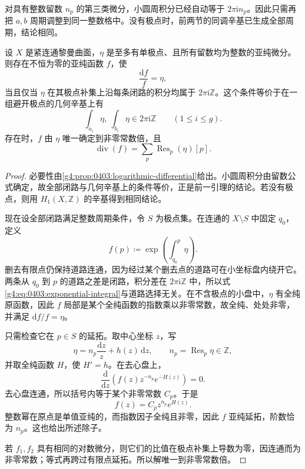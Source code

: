 对具有整数留数 \(n_p\) 的第三类微分，小圆周积分已经自动等于 \(2\pi\mathrm{i}n_p\)。因此只需再把 \(a,b\) 周期调整到同一整数格中。没有极点时，前两节的同调辛基已生成全部周期，结论相同。

\begin{proposition}
	\label{g4:prop:0403:exponential-integral}
	设 \(X\) 是紧连通黎曼曲面，\(\eta\) 是至多有单极点、且所有留数均为整数的亚纯微分。则存在不恒为零的亚纯函数 \(f\)，使
	\[
		\frac{\mathrm{d}f}{f}=\eta,
	\]
	当且仅当 \(\eta\) 在其极点补集上沿每条闭路的积分均属于 \(2\pi\mathrm{i}\mathbb Z\)。这个条件等价于在一组避开极点的几何辛基上有
	\[
		\int_{a_i}\eta,\ \int_{b_i}\eta\in2\pi\mathrm{i}\mathbb Z
		\qquad(1\le i\le g).
	\]
	存在时，\(f\) 由 \(\eta\) 唯一确定到非零常数倍，且
	\[
		\operatorname{div}(f)
		=\sum_p\operatorname{Res}_p(\eta)[p].
	\]
\end{proposition}
\begin{proof}
	必要性由\cref{g4:prop:0403:logarithmic-differential}给出。小圆周积分由留数公式确定，故全部闭路与几何辛基上的条件等价，正是前一引理的结论。若没有极点，则用 \(H_1(X,\mathbb Z)\) 的辛基得到相同结论。

	现在设全部闭路满足整数周期条件，令 \(S\) 为极点集。在连通的 \(X\setminus S\) 中固定 \(q_0\)，定义
	\begin{equation}
		\label{g4:eq:0403:exponential-integral}
		f(p)\coloneqq
		\exp\left(\int_{q_0}^{p}\eta\right).
	\end{equation}
	删去有限点仍保持道路连通，因为经过某个删去点的道路可在小坐标盘内绕开它。两条从 \(q_0\) 到 \(p\) 的道路之差是闭路，积分差在 \(2\pi\mathrm{i}\mathbb Z\) 中，所以式\eqref{g4:eq:0403:exponential-integral}与道路选择无关。在不含极点的小盘中，\(\eta\) 有全纯原函数，因此 \(f\) 局部是某个全纯函数的指数乘以非零常数，故全纯、处处非零，并满足 \(\mathrm{d}f/f=\eta\)。

	只需检查它在 \(p\in S\) 的延拓。取中心坐标 \(z\)，写
	\[
		\eta=n_p\frac{\mathrm{d}z}{z}+h(z)\,\mathrm{d}z,
		\qquad n_p=\operatorname{Res}_p\eta\in\mathbb Z,
	\]
	并取全纯函数 \(H\)，使 \(H'=h\)。在去心盘上，
	\[
		\frac{\mathrm{d}}{\mathrm{d}z}
		\left(f(z)z^{-n_p}e^{-H(z)}\right)=0.
	\]
	去心盘连通，所以括号内等于某个非零常数 \(C_p\)。于是
	\begin{equation}
		\label{g4:eq:0403:local-exponential}
		f(z)=C_p z^{n_p}e^{H(z)}.
	\end{equation}
	整数幂在原点是单值亚纯的，而指数因子全纯且非零，因此 \(f\) 亚纯延拓，阶数恰为 \(n_p\)。这也给出所述除子。

	若 \(f_1,f_2\) 具有相同的对数微分，则它们的比值在极点补集上导数为零，因连通而为非零常数；等式再跨过有限点延拓。所以解唯一到非零常数倍。
\end{proof}

